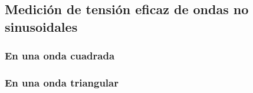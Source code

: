   \subsection{Medición de tensión eficaz de ondas no sinusoidales}
    
    \subsubsection{En una onda cuadrada}

    \subsubsection{En una onda triangular}

  
